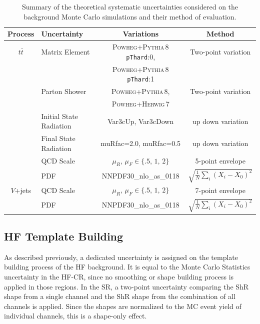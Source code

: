   \begin{table}[!htbp]
  {
    \begin{tabular}{clcc}
      \hline\hline
      Process & Uncertainty & Variations & Method\\
      \hline
      $t\bar{t}$    & Matrix Element & \textsc{Powheg}+\textsc{Pythia\,8} \texttt{pThard}:0,  & Two-point variation\\
      & & \textsc{Powheg}+\textsc{Pythia\,8} \texttt{pThard}:1 & \\
      & Parton Shower & \textsc{Powheg}+\textsc{Pythia\,8},  & Two-point variation\\
      & & \textsc{Powheg}+\textsc{Herwig\,7} & \\
      & Initial State Radiation & Var3cUp, Var3cDown & up down variation \\
      & Final State Radiation & muRfac=2.0, muRfac=0.5 & up down variation \\
      & QCD Scale &  $\mu_R,\,\mu_F\in\{.5,\,1,\,2\}$ & 5-point envelope \\
      & PDF & NNPDF30\_nlo\_as\_0118 & $\sqrt{\frac{1}{N} \sum_i\left(X_i-X_0\right)^2}$\\
      \hline
      $V$+jets & QCD Scale & $\mu_R,\,\mu_F\in\{.5,\,1,\,2\}$ & 7-point envelope \\
      & PDF & NNPDF30\_nlo\_as\_0118 & $\sqrt{\frac{1}{N} \sum_i\left(X_i-X_0\right)^2}$\\
      \hline
      \hline
    \end{tabular}
    }
    \centering
    \caption{Summary of the theoretical systematic uncertainties considered on the background Monte Carlo simulations and their method of evaluation.}
    \label{tab:sys_theo}
  \end{table}

\subsection*{HF Template Building}
As described previously, a dedicated uncertainty is assigned on the template building process of the HF background. It is equal to the Monte Carlo Statistics uncertainty in the HF-CR, since no smoothing or shape building process is applied in those regions. In the SR, a two-point uncertainty comparing the ShR shape from a single channel and the ShR shape from the combination of all channels is applied. Since the shapes are normalized to the MC event yield of individual channels, this is a shape-only effect.

